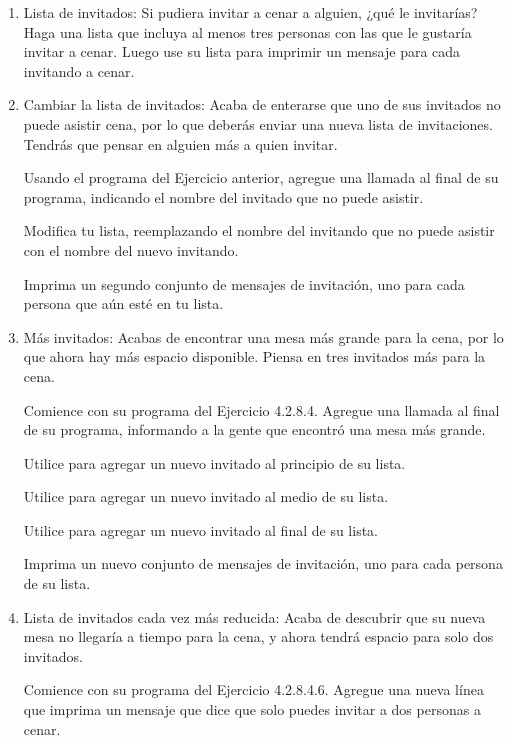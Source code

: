 \begin{enumerate}[4.2.8.4]
	
	\item Lista de invitados: Si pudiera invitar a cenar a alguien,   ¿qué le invitarías? 
	Haga una lista que incluya al menos tres personas con las que le gustaría invitar a cenar. 
	Luego use su lista para imprimir un mensaje para cada invitando a cenar.
	
	
	\item[4.2.8.5] Cambiar la lista de invitados: Acaba de enterarse  que uno de sus invitados no puede asistir
	cena, por lo que deberás enviar una nueva lista de invitaciones. Tendrás que pensar en alguien más a quien invitar.
	
	Usando el programa del Ejercicio anterior, agregue una llamada {} al final de
	su programa, indicando el nombre del invitado que no puede asistir.
	
	Modifica tu lista, reemplazando el nombre del invitando que no puede asistir con el
	nombre del  nuevo  invitando.
	
	Imprima un segundo conjunto de mensajes de invitación, uno para cada persona que aún esté en
	tu lista.
	
	
	\item[4.2.8.6] Más invitados: Acabas de encontrar una mesa más grande para la cena, por lo que ahora hay más espacio
	disponible. Piensa en tres invitados más para la cena.
	
	Comience con su programa del Ejercicio 4.2.8.4. Agregue una llamada {} al
	final de su programa, informando a la gente que encontró una mesa más grande.
	
	Utilice {}  para agregar un nuevo invitado al principio de su lista.
	
	Utilice  {} para agregar un nuevo invitado al medio de su lista.
	
	Utilice {} para agregar un nuevo invitado al final de su lista.
	
	Imprima un nuevo conjunto de mensajes de invitación, uno para cada persona de su lista.
	
	\item[4.2.8.7] Lista de invitados cada vez más reducida: Acaba de descubrir que su nueva mesa no 
	llegaría  a tiempo para la cena, y ahora tendrá espacio para solo dos invitados.
	
	Comience con su programa del Ejercicio  4.2.8.4.6. Agregue una nueva línea que imprima un
	mensaje que dice que solo puedes invitar a dos personas a cenar.
	

\end{enumerate}
